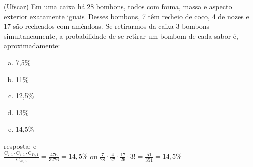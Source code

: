 \begin{ex}
(Ufscar) Em uma caixa há 28 bombons, todos com forma, massa e aspecto exterior exatamente iguais. Desses bombons, 7 têm recheio de coco, 4 de nozes e 17 são recheados com amêndoas. Se retirarmos da caixa 3 bombons simultaneamente, a probabilidade de se retirar um bombom de cada sabor é, aproximadamente:
   \begin{enumerate}[(a)]
   \item 7,5\%
   \item 11\%
   \item 12,5\%
   \item 13\%
   \item 14,5\%
   \end{enumerate}
     \begin{sol}
      resposta: e \\
      $\frac{\mathrm{C}_{7,1}\cdot \mathrm{C}_{4,1}\cdot \mathrm{C}_{{17},1}}{\mathrm{C}_{{28},3}}=\frac{476}{3276}=14,5\%$\hspace{0,1cm} ou \hspace{0,1cm} $\frac{7}{28} \cdot \frac{4}{27} \cdot \frac{17}{26} \cdot 3!=\frac{51}{351}=14,5\%$
     \end{sol}
\end{ex}